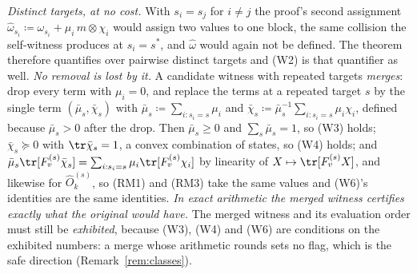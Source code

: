 \begin{remark}
\emph{Distinct targets, at no cost.} With $s_i=s_j$ for $i\ne j$ the
proof's second assignment
$\hat\omega_{s_i}\coloneqq\omega_{s_i}+\mu_i\,m\otimes\chi_i$ would assign
two values to one block, the same collision the self-witness produces at
$s_i=s^{*}$, and $\hat\omega$ would again not be defined. The theorem
therefore quantifies over pairwise distinct targets and (W2) is that
quantifier as well. \emph{No removal is lost by it.} A candidate witness
with repeated targets \emph{merges}: drop every term with $\mu_i=0$, and
replace the terms at a repeated target $s$ by the single term
$(\bar\mu_s,\bar\chi_s)$ with $\bar\mu_s\coloneqq\sum_{i:s_i=s}\mu_i$ and
$\bar\chi_s\coloneqq\bar\mu_s^{-1}\sum_{i:s_i=s}\mu_i\chi_i$, defined
because $\bar\mu_s>0$ after the drop. Then $\bar\mu_s\ge0$ and
$\sum_s\bar\mu_s=1$, so (W3) holds; $\bar\chi_s\succeq0$ with
$\tr\bar\chi_s=1$, a convex combination of states, so (W4) holds; and
$\bar\mu_s\tr[F^{(s)}_v\bar\chi_s]=\sum_{i:s_i=s}\mu_i\tr[F^{(s)}_v\chi_i]$
by linearity of $X\mapsto\tr[F^{(s)}_vX]$, and likewise for
$\hat O^{(s)}_k$, so (RM1) and (RM3) take the same values and (W6)'s
identities are the same identities. \emph{In exact arithmetic the merged
witness certifies exactly what the original would have.} The merged
witness and its evaluation order must still be \emph{exhibited}, because
(W3), (W4) and (W6) are conditions on the exhibited numbers: a merge whose
arithmetic rounds sets no flag, which is the safe direction
(Remark~\ref{rem:classes}).
\end{remark}
